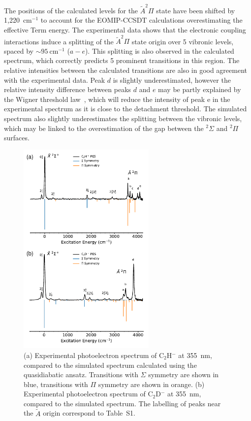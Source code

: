 \documentclass[journal=jpcafh,manuscript=article,layout=onecolumn, 12pt]{achemso}
\begin{document}
The positions of the calculated levels for the $\tilde{A}^2\Pi$ state have been shifted by 1,220~cm$^{-1}$ to account for the EOMIP-CCSDT calculations overestimating the effective Term energy. The experimental data shows that the electronic coupling interactions induce a splitting of the $\tilde{A} ^2\Pi$ state origin over 5 vibronic levels, spaced by $\sim 95~$cm$^{-1}$ ($a-e$). This splitting is also observed in the calculated spectrum, which correctly predicts 5 prominent transitions in this region. The relative intensities between the calculated transitions are also in good agreement with the experimental data. Peak $d$ is slightly underestimated, however the relative intensity difference between peaks $d$ and $e$ may be partly explained by the Wigner threshold law~\cite{wig48}, which will reduce the intensity of peak e in the experimental spectrum as it is close to the detachment threshold. The simulated spectrum also slightly underestimates the splitting between the vibronic levels, which may be linked to the overestimation of the gap between the $^2\Sigma$ and $^2\Pi$ surfaces.

\begin{figure}[th!]
	\includegraphics[width=0.6\textwidth]{figures/Fig5.pdf}
	\caption{(a) Experimental photoelectron spectrum of C$_2$H$^-$ at 355~nm, compared to the simulated spectrum calculated using the quasidiabatic ansatz. Transitions with $\Sigma$ symmetry are shown in blue, transitions with $\Pi$ symmetry are shown in orange. (b) Experimental photoelectron spectrum of C$_2$D$^-$ at 355~nm, compared to the simulated spectrum. The labelling of peaks near the $\tilde{A}$ origin correspond to Table~S1.}
	\label{fig:3}
\end{figure}
\end{document}
